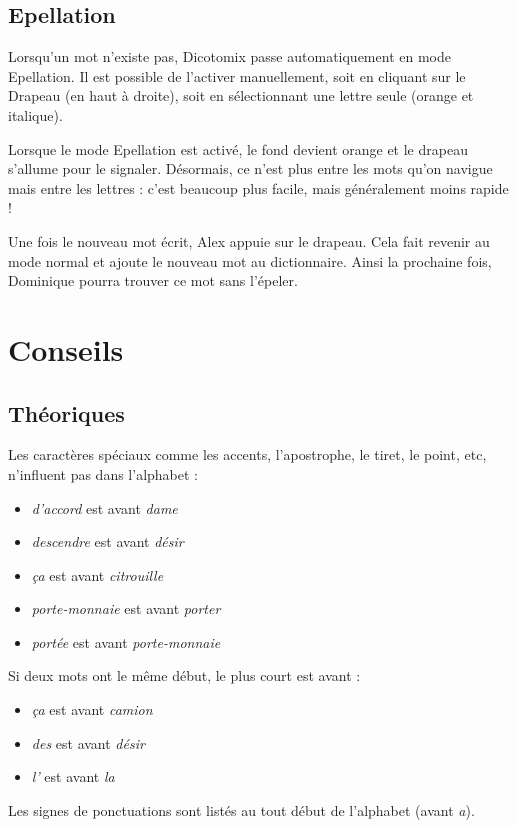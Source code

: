 \documentclass[french]{article}
\newcommand\image[2][.4]{\begin{center}\frame{\texttt{[image: images/\#2]}}\end{center}}
\begin{document}
\subsection{Epellation}
Lorsqu'un mot n'existe pas, Dicotomix passe automatiquement en mode Epellation. Il est possible de l'activer manuellement, soit en cliquant sur le Drapeau (en haut à droite), soit en sélectionnant une lettre seule (orange et italique).
\image{activeSpell-small.png}

Lorsque le mode Epellation est activé, le fond devient orange et le drapeau s'allume pour le signaler. Désormais, ce n'est plus entre les mots qu'on navigue mais entre les lettres : c'est beaucoup plus facile, mais généralement moins rapide !
\image{spell.png}

Une fois le nouveau mot écrit, Alex appuie sur le drapeau. Cela fait revenir au mode normal et ajoute le nouveau mot au dictionnaire. Ainsi la prochaine fois, Dominique pourra trouver ce mot sans l'épeler.

\section{Conseils}
\subsection{Théoriques}
Les caractères spéciaux comme les accents, l'apostrophe, le tiret, le point, etc, n'influent pas dans l'alphabet :
\begin{itemize}
	\item \emph{d'accord} est avant \emph{dame}
	\item \emph{descendre} est avant \emph{désir}
	\item \emph{ça} est avant \emph{citrouille}
	\item \emph{porte-monnaie} est avant \emph{porter}
	\item \emph{portée} est avant \emph{porte-monnaie}
\end{itemize}
\vspace{3mm}
Si deux mots ont le même début, le plus court est avant :
\begin{itemize}
	\item \emph{ça} est avant \emph{camion}
	\item \emph{des} est avant \emph{désir}
	\item \emph{l'} est avant \emph{la}
\end{itemize}
\vspace{3mm}
Les signes de ponctuations sont listés au tout début de l'alphabet (avant \emph{a}).
\end{document}
